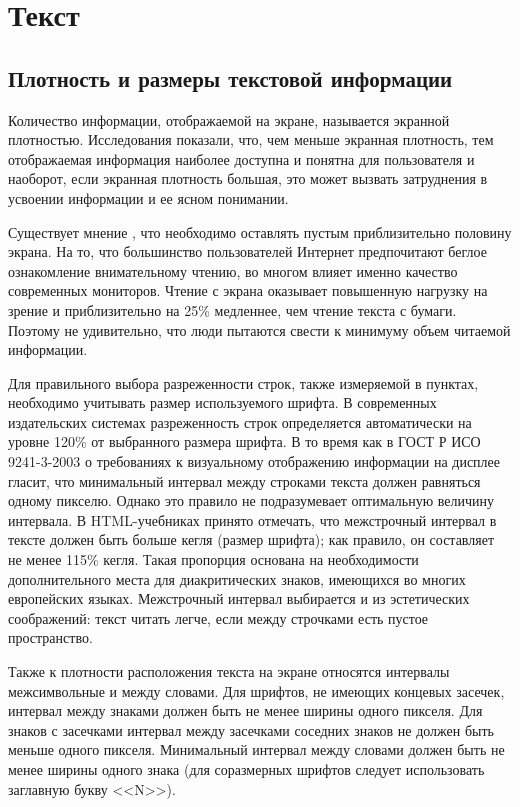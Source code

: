 \documentclass[14pt]{extarticle}
\begin{document}
\section{Текст}

\subsection{Плотность и размеры текстовой информации}

Количество информации, отображаемой на экране, называется экранной плотностью. Исследования показали, что, чем меньше экранная плотность, тем отображаемая информация наиболее доступна и понятна для пользователя и наоборот, если экранная плотность большая, это может вызвать затруднения в усвоении информации и ее ясном понимании.

Существует мнение , что необходимо оставлять пустым приблизительно половину экрана. На то, что большинство пользователей Интернет предпочитают беглое ознакомление внимательному чтению, во многом влияет именно качество современных мониторов. Чтение с экрана оказывает повышенную нагрузку на зрение и приблизительно на 25\% медленнее, чем чтение текста с бумаги. Поэтому не удивительно, что люди пытаются свести к минимуму объем читаемой информации.

Для правильного выбора разреженности строк, также измеряемой в пунктах, необходимо учитывать размер используемого шрифта. В современных издательских системах разреженность строк определяется автоматически на уровне 120\% от выбранного размера шрифта. В то время как в ГОСТ Р ИСО 9241-3-2003 о требованиях к визуальному отображению информации на дисплее гласит, что минимальный интервал между строками текста должен равняться одному пикселю. Однако это правило не подразумевает оптимальную величину интервала. В HTML-учебниках принято отмечать, что межстрочный интервал в тексте должен быть больше кегля (размер шрифта); как правило, он составляет не менее 115\% кегля. Такая пропорция основана на необходимости дополнительного места для диакритических знаков, имеющихся во многих европейских языках. Межстрочный интервал выбирается и из эстетических соображений: текст читать легче, если между строчками есть пустое пространство.

Также к плотности расположения текста на экране относятся интервалы межсимвольные и между словами. Для шрифтов, не имеющих концевых засечек, интервал между знаками должен быть не менее ширины одного пикселя. Для знаков с засечками интервал между засечками соседних знаков не должен быть меньше одного пикселя. Минимальный интервал между словами должен быть не менее ширины одного знака (для соразмерных шрифтов следует использовать заглавную букву <<N>>).
\end{document}
